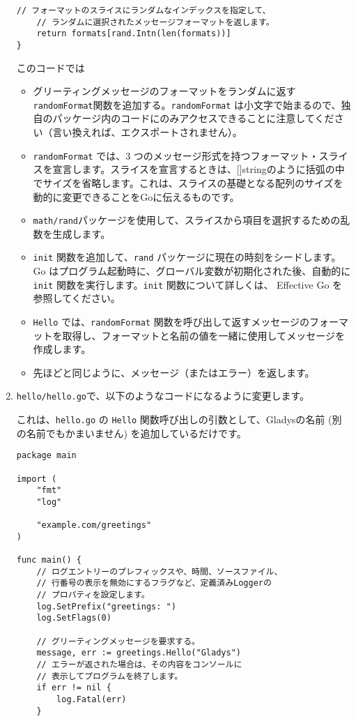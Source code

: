 \begin{enumerate}
\begin{lstlisting}[numbers=none]
    // フォーマットのスライスにランダムなインデックスを指定して、
    // ランダムに選択されたメッセージフォーマットを返します。
    return formats[rand.Intn(len(formats))]
}
\end{lstlisting}
このコードでは
\begin{itemize}
\item グリーティングメッセージのフォーマットをランダムに返す\texttt{randomFormat}関数を追加する。\texttt{randomFormat} は小文字で始まるので、独自のパッケージ内のコードにのみアクセスできることに注意してください（言い換えれば、エクスポートされません）。
\item \texttt{randomFormat} では、3 つのメッセージ形式を持つフォーマット・スライスを宣言します。スライスを宣言するときは、[]stringのように括弧の中でサイズを省略します。これは、スライスの基礎となる配列のサイズを動的に変更できることをGoに伝えるものです。
\item \texttt{math/rand}パッケージを使用して、スライスから項目を選択するための乱数を生成します。
\item \texttt{init} 関数を追加して、\texttt{rand} パッケージに現在の時刻をシードします。Go はプログラム起動時に、グローバル変数が初期化された後、自動的に \texttt{init} 関数を実行します。\texttt{init} 関数について詳しくは、 Effective Go を参照してください。
\item \texttt{Hello} では、\texttt{randomFormat} 関数を呼び出して返すメッセージのフォーマットを取得し、フォーマットと名前の値を一緒に使用してメッセージを作成します。
\item 先ほどと同じように、メッセージ（またはエラー）を返します。
\end{itemize}

\item \texttt{hello/hello.go}で、以下のようなコードになるように変更します。

これは、\texttt{hello.go} の \texttt{Hello} 関数呼び出しの引数として、Gladysの名前 (別の名前でもかまいません) を追加しているだけです。

\begin{lstlisting}[numbers=none]
package main

import (
    "fmt"
    "log"

    "example.com/greetings"
)

func main() {
    // ログエントリーのプレフィックスや、時間、ソースファイル、
    // 行番号の表示を無効にするフラグなど、定義済みLoggerの
    // プロパティを設定します。
    log.SetPrefix("greetings: ")
    log.SetFlags(0)

    // グリーティングメッセージを要求する。
    message, err := greetings.Hello("Gladys")
    // エラーが返された場合は、その内容をコンソールに
    // 表示してプログラムを終了します。
    if err != nil {
        log.Fatal(err)
    }


\end{lstlisting}
\end{enumerate}
